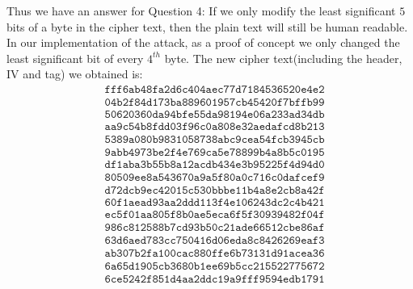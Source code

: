 \documentclass[11pt]{llncs}
\begin{document}
Thus we have an answer for Question 4: If we only modify the least significant $5$ bits of a byte in the cipher text, then the plain text will still be human readable. In our implementation of the attack, as a proof of concept we only changed the least significant bit of every $4^{th}$ byte. The new cipher text(including the header, IV and tag) we obtained is:
\[\begin{aligned}
& \texttt{fff6ab48fa2d6c404aec77d7184536520e4e2}\\                                                                                   & \texttt{04b2f84d173ba889601957cb45420f7bffb99}\\                                                                                   & \texttt{50620360da94bfe55da98194e06a233ad34db}\\                                                                                   & \texttt{aa9c54b8fdd03f96c0a808e32aedafcd8b213}\\                                                                                   & \texttt{5389a080b9831058738abc9cea54fcb3945cb}\\                                                                                   & \texttt{9abb4973be2f4e769ca5e78899b4a8b5c0195}\\                                                                                   & \texttt{df1aba3b55b8a12acdb434e3b95225f4d94d0}\\                                                                                   & \texttt{80509ee8a543670a9a5f80a0c716c0dafcef9}\\                                                                                   & \texttt{d72dcb9ec42015c530bbbe11b4a8e2cb8a42f}\\                                                                                   & \texttt{60f1aead93aa2ddd113f4e106243dc2c4b421}\\                                                                                   & \texttt{ec5f01aa805f8b0ae5eca6f5f30939482f04f}\\                                                                                   & \texttt{986c812588b7cd93b50c21ade66512cbe86af}\\                                                                                   & \texttt{63d6aed783cc750416d06eda8c8426269eaf3}\\                                                                                   & \texttt{ab307b2fa100cac880ffe6b73131d91acea36}\\                                                                                   & \texttt{6a65d1905cb3680b1ee69b5cc215522775672}\\                                                                                   & \texttt{6ce5242f851d4aa2ddc19a9fff9594edb1791}
\end{aligned}\]
\end{document}
